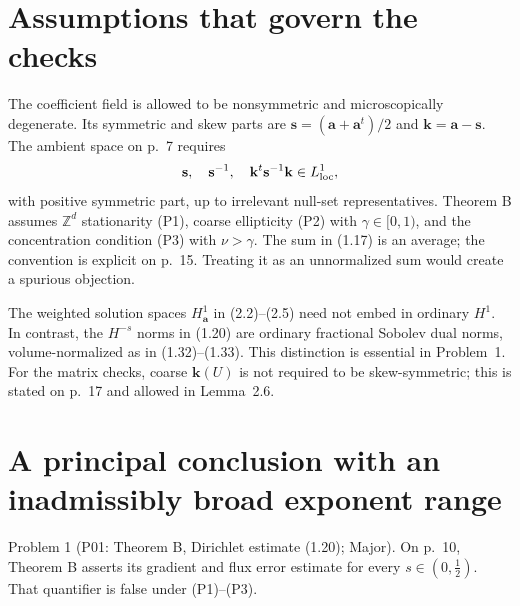 \documentclass[10pt]{article}
\begin{document}
\section*{Assumptions that govern the checks}
The coefficient field is allowed to be nonsymmetric and microscopically degenerate. Its symmetric and skew parts are \(\mathbf s=(\mathbf a+\mathbf a^t)/2\) and \(\mathbf k=\mathbf a-\mathbf s\). The ambient space on p. 7 requires \[\mathbf s,\quad \mathbf s^{-1},\quad
 \mathbf k^t\mathbf s^{-1}\mathbf k\in L^1_{\rm loc},\] with positive symmetric part, up to irrelevant null-set representatives. Theorem B assumes \(\mathbb Z^d\) stationarity (P1), coarse ellipticity (P2) with \(\gamma\in[0,1)\), and the concentration condition (P3) with \(\nu>\gamma\). The sum in (1.17) is an average; the convention is explicit on p. 15. Treating it as an unnormalized sum would create a spurious objection.\par
The weighted solution spaces \(H^1_{\mathbf a}\) in (2.2)–(2.5) need not embed in ordinary \(H^1\). In contrast, the \(H^{-s}\) norms in (1.20) are ordinary fractional Sobolev dual norms, volume-normalized as in (1.32)–(1.33). This distinction is essential in Problem 1. For the matrix checks, coarse \(\mathbf k(U)\) is not required to be skew-symmetric; this is stated on p. 17 and allowed in Lemma 2.6.\par
\section*{A principal conclusion with an inadmissibly broad exponent range}
Problem 1 (P01: Theorem B, Dirichlet estimate (1.20); Major).  On p. 10, Theorem B asserts its gradient and flux error estimate for every \(s\in(0,\tfrac12)\). That quantifier is false under (P1)–(P3).\par
\end{document}
